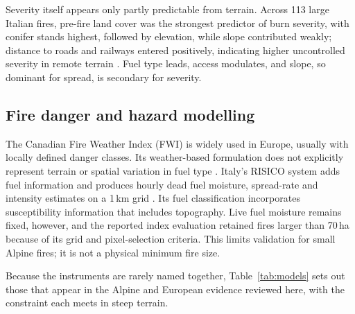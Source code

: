\documentclass[11pt,a4paper]{article}
\begin{document}
Severity itself appears only partly predictable from terrain. Across 113 large Italian fires, pre-fire land cover was the strongest predictor of burn severity, with conifer stands highest, followed by elevation, while slope contributed weakly; distance to roads and railways entered positively, indicating higher uncontrolled severity in remote terrain \citep{malandra_burn_2022}. Fuel type leads, access modulates, and slope, so dominant for spread, is secondary for severity.

\subsection{Fire danger and hazard modelling}

The Canadian Fire Weather Index (FWI) is widely used in Europe, usually with locally defined danger classes. Its weather-based formulation does not explicitly represent terrain or spatial variation in fuel type \citep{zacharakis_environmental_2023}. Italy's RISICO system adds fuel information and produces hourly dead fuel moisture, spread-rate and intensity estimates on a 1\,km grid \citep{perello_fuelaware_2025}. Its fuel classification incorporates susceptibility information that includes topography. Live fuel moisture remains fixed, however, and the reported index evaluation retained fires larger than 70\,ha because of its grid and pixel-selection criteria. This limits validation for small Alpine fires; it is not a physical minimum fire size.

Because the instruments are rarely named together, Table~\ref{tab:models} sets out those that appear in the Alpine and European evidence reviewed here, with the constraint each meets in steep terrain.
\end{document}
